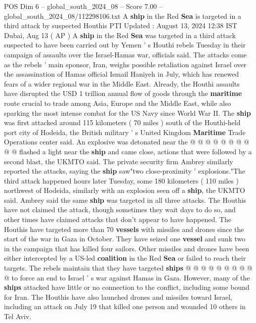 \begin{textsample}{POS Dim 6 – global\_south\_2024\_08 – Score 7.00 – global\_south\_2024\_08/112298106.txt}  \label{ex:f6_pos_325}
A \textbf{ship} in the Red \textbf{Sea} is targeted in a third attack by suspected Houthis PTI Updated : August 13, 2024 12:38 IST Dubai, Aug 13 ( AP ) A \textbf{ship} in the Red \textbf{Sea} was targeted in a third attack suspected to have been carried out by Yemen ' s Houthi rebels Tuesday in their campaign of assaults over the Israel-Hamas war, officials said.
The attacks come as the rebels ' main sponsor, Iran, weighs possible retaliation against Israel over the assassination of Hamas official Ismail Haniyeh in July, which has renewed fears of a wider regional war in the Middle East.
Already, the Houthi assaults have disrupted the USD 1 trillion annual flow of goods through the \textbf{maritime} route crucial to trade among Asia, Europe and the Middle East, while also sparking the most intense combat for the US Navy since World War II.
The \textbf{ship} was first attacked around 115 kilometers ( 70 miles ) south of the Houthi-held port city of Hodeida, the British military ' s United Kingdom \textbf{Maritime} Trade Operations center said.
An explosive was detonated near the @ @ @ @ @ @ @ @ @ @ flashed a light near the \textbf{ship} and came close, actions that were followed by a second blast, the UKMTO said.
The private security firm Ambrey similarly reported the attacks, saying the \textbf{ship} saw"two close-proximity ' explosions."The third attack happened hours later Tuesday, some 180 kilometers ( 110 miles ) northwest of Hodeida, similarly with an explosion seen off a \textbf{ship}, the UKMTO said.
Ambrey said the same \textbf{ship} was targeted in all three attacks.
The Houthis have not claimed the attack, though sometimes they wait days to do so, and other times have claimed attacks that don't appear to have happened.
The Houthis have targeted more than 70 \textbf{vessels} with missiles and drones since the start of the war in Gaza in October.
They have seized one \textbf{vessel} and sunk two in the campaign that has killed four sailors.
Other missiles and drones have been either intercepted by a US-led \textbf{coalition} in the Red \textbf{Sea} or failed to reach their targets.
The rebels maintain that they have targeted \textbf{ships} @ @ @ @ @ @ @ @ @ @ to force an end to Israel ' s war against Hamas in Gaza.
However, many of the \textbf{ships} attacked have little or no connection to the conflict, including some bound for Iran.
The Houthis have also launched drones and missiles toward Israel, including an attack on July 19 that killed one person and wounded 10 others in Tel Aviv.

\end{textsample}
